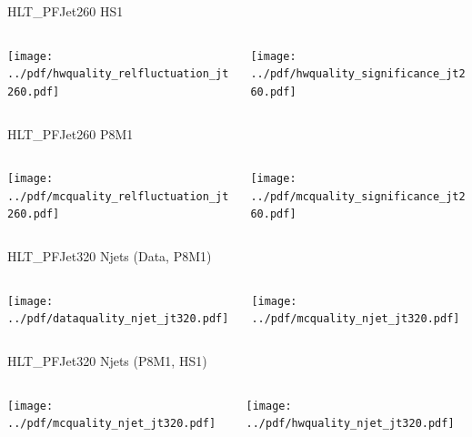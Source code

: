 \documentclass[9pt]{beamer}
\begin{document}
\begin{frame}[t]{HLT\_PFJet260 HS1}
\begin{columns}[T]
  \begin{column}{.5\textwidth}
  \texttt{[image: ../pdf/hwquality\_relfluctuation\_jt260.pdf]}
  \end{column}
  \begin{column}{.5\textwidth}
  \texttt{[image: ../pdf/hwquality\_significance\_jt260.pdf]}
  \end{column}
\end{columns}
\end{frame}

\begin{frame}[t]{HLT\_PFJet260 P8M1}
\begin{columns}[T]
  \begin{column}{.5\textwidth}
  \texttt{[image: ../pdf/mcquality\_relfluctuation\_jt260.pdf]}
  \end{column}
  \begin{column}{.5\textwidth}
  \texttt{[image: ../pdf/mcquality\_significance\_jt260.pdf]}
  \end{column}
\end{columns}
\end{frame}


\begin{frame}[t]{HLT\_PFJet320 Njets (Data, P8M1)}
\begin{columns}[T]
  \begin{column}{.5\textwidth}
  \texttt{[image: ../pdf/dataquality\_njet\_jt320.pdf]}
  \end{column}
  \begin{column}{.5\textwidth}
  \texttt{[image: ../pdf/mcquality\_njet\_jt320.pdf]}
  \end{column}
\end{columns}
\end{frame}

\begin{frame}[t]{HLT\_PFJet320 Njets (P8M1, HS1)}
\begin{columns}[T]
  \begin{column}{.5\textwidth}
  \texttt{[image: ../pdf/mcquality\_njet\_jt320.pdf]}
  \end{column}
  \begin{column}{.5\textwidth}
  \texttt{[image: ../pdf/hwquality\_njet\_jt320.pdf]}
  \end{column}
\end{columns}
\end{frame}
\end{document}
